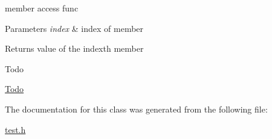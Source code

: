 member access func 


\begin{DoxyParams}{Parameters}
{\em index} & index of member \\
\hline
\end{DoxyParams}
\begin{DoxyReturn}{Returns}
value of the index\textquotesingle{}th member 
\end{DoxyReturn}
\begin{DoxyRefDesc}{Todo}
\item[\hyperlink{todo__todo000001}{Todo}]\end{DoxyRefDesc}


The documentation for this class was generated from the following file\+:\begin{DoxyCompactItemize}
\item 
\hyperlink{test_8h}{test.\+h}\end{DoxyCompactItemize}
